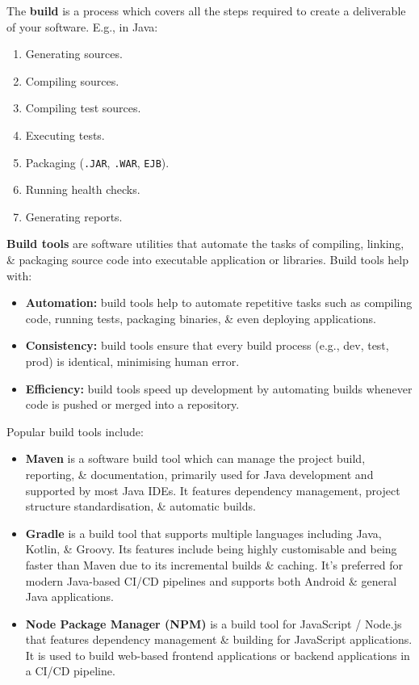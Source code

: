 \documentclass[a4paper,11pt]{article}
\begin{document}
The \textbf{build} is a process which covers all the steps required to create a deliverable of your software.
E.g., in Java:
\begin{enumerate}
    \item   Generating sources.
    \item   Compiling sources.
    \item   Compiling test sources.
    \item   Executing tests.
    \item   Packaging (\verb|.JAR|, \verb|.WAR|, \verb|EJB|).
    \item   Running health checks.
    \item   Generating reports.
\end{enumerate}

\textbf{Build tools} are software utilities that automate the tasks of compiling, linking, \& packaging source code into 
executable application or libraries.
Build tools help with:
\begin{itemize}
    \item   \textbf{Automation:} build tools help to automate repetitive tasks such as compiling code, running tests, 
            packaging binaries, \& even deploying applications.
    \item   \textbf{Consistency:} build tools ensure that every build process (e.g., dev, test, prod) is identical, 
            minimising human error.
    \item   \textbf{Efficiency:} build tools speed up development by automating builds whenever code is pushed or merged 
            into a repository.
\end{itemize}

Popular build tools include:
\begin{itemize}
    \item   \textbf{Maven} is a software build tool which can manage the project build, reporting, \& documentation,
            primarily used for Java development and supported by most Java IDEs.
            It features dependency management, project structure standardisation, \& automatic builds.
    \item   \textbf{Gradle} is a build tool that supports multiple languages including Java, Kotlin, \& Groovy.
            Its features include being highly customisable and being faster than Maven due to its incremental builds \&
            caching.
            It's preferred for modern Java-based CI/CD pipelines and supports both Android \& general Java applications.
    \item   \textbf{Node Package Manager (NPM)} is a build tool for JavaScript / Node.js that features dependency 
            management \& building for JavaScript applications.
            It is used to build web-based frontend applications or backend applications in a CI/CD pipeline.
\end{itemize}
\end{document}
